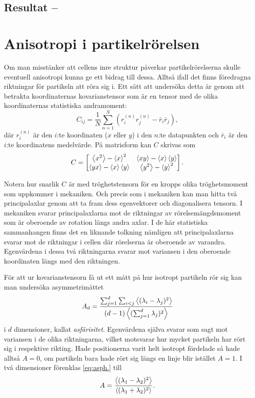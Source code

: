 \subsection{Resultat -- }






\section{Anisotropi i partikelrörelsen}
Om man misstänker att cellens inre struktur påverkar partikelrörelserna skulle eventuell anisotropi kunna ge ett bidrag till dessa. Alltså ifall det finns föredragna riktningar för partikeln att röra sig i. Ett sätt att undersöka detta är genom att betrakta koordinaternas kovarianstensor som är en tensor med de olika koordinaternas statistiska andramoment:
\begin{equation}
C_{ij} = \frac{1}{N} \sum_{n=1}^{N} 
\left(r_i^{(n)}r_j^{(n)} -\bar{r}_i\bar{r}_j \right),
\end{equation}
där $r_i^{(n)}$ är den $i$:te koordinaten ($x$ eller $y$) i den $n$:te datapunkten och $\bar{r}_i$ är den $i$:te koordinatens medelvärde. På matrisform kan $C$ skrivas som
\begin{equation}\label{eq:C_matris}
C=
\begin{bmatrix} 
\ev{x^2}-\ev{x}^2 & \ev{xy}-\ev{x}\ev{y}\\
\ev{yx}-\ev{x}\ev{y} & \ev{y^2}-\ev{y}^2
\end{bmatrix}.
\end{equation}

Notera hur snarlik $C$ är med tröghetstensorn för en kropps olika tröghetsmoment som uppkommer i mekaniken. Och precis som i mekaniken kan man hitta två principalaxlar genom att ta fram dess egenvektorer och diagonalisera tensorn. I mekaniken svarar principalaxlarna mot de riktningar av rörelsemängdsmoment som är oberoende av rotation längs andra axlar. I de här statistiska sammanhangen finns det en liknande tolkning nämligen att principalaxlarna svarar mot de riktningar i cellen där rörelserna är oberoende av varandra. Egenvärdena i dessa två riktningarna svarar mot variansen i den oberoende koordinaten längs med den riktningen.

För att ur kovarianstensorn få ut ett mått på hur isotropt partikeln rör sig kan man undersöka asymmetrimåttet~\cite{Rudnick_Asphericity1986}
\begin{equation}\label{eq:asph.}
    A_d=\frac{\sum_{j=1}^d\sum_{i<j} 
\ev{(\lambda_i-\lambda_j)^2} }{
(d-1) \ev{(\sum_{j=1}^d \lambda_j)^2}}
\end{equation}
i $d$ dimensioner, kallat \emph{asfärisitet}. Egenvärdena själva svarar som sagt mot variansen i de olika riktningarna, vilket motsvarar hur mycket partikeln har rört sig i respektive rikting. Hade positionerna varit helt isotropt fördelade så hade alltså $A=0$, om partikeln bara hade rört sig längs en linje blir istället $A=1$.
I två dimensioner förenklas \eqref{eq:asph.} till 
\begin{equation}\label{eq:asph._2D}
    A=\frac{\ev{(\lambda_1 - \lambda_2)^2}}{\ev{(\lambda_1 + \lambda_2)^2}}.
\end{equation}

